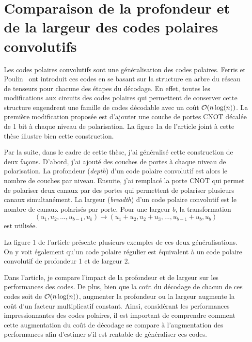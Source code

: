 \section{Comparaison de la profondeur et de la largeur des codes polaires convolutifs}

Les codes polaires convolutifs sont une généralisation des codes polaires.
Ferris et Poulin~\cite{ferris_branching_2014} ont introduit ces codes
en se basant sur la structure en arbre du réseau de tenseurs pour 
chacune des étapes du décodage.
En effet, 
toutes les modifications aux circuits des codes polaires qui permettent
de conserver cette structure engendrent une famille de codes décodable
avec un coût $\mathcal{O}(n \log(n))$.
La première modification proposée est d'ajouter 
une couche de portes CNOT décalée de 1 bit à chaque niveau de polarisation.
La figure 1a de l'article joint à cette thèse illustre bien cette construction.

Par la suite,
dans le cadre de cette thèse,
j'ai généralisé cette construction de deux façons.
D'abord,
j'ai ajouté des couches de portes à chaque niveau de polarisation.
La profondeur (\textit{depth}) d'un code polaire convolutif est
alors le nombre de couches par niveau.
Ensuite, j'ai remplacé la porte CNOT qui
permet de polariser deux canaux par des portes qui permettent de polariser plusieurs 
canaux simultanément.
La largeur (\textit{breadth}) d'un code polaire convolutif est le nombre de
canaux polarisés par porte.
Pour une largeur $b$, 
la transformation
\begin{equation}
  (u_1, u_2, \ldots, u_{b-1}, u_b) 
  \to 
  (u_1 + u_2, u_2 + u_3, \ldots, u_{b-1} + u_b, u_b) 
\end{equation}
est utilisée.

La figure 1 de l'article présente plusieurs exemples de ces deux généralisations.
On y voit également qu'un code polaire régulier est équivalent à un code polaire convolutif
de profondeur 1 et de largeur 2.

Dans l'article,
je compare l'impact de la profondeur et de largeur sur les performances des codes.
De plus, 
bien que la coût du décodage de chacun de ces codes soit de $\mathcal{O}(n \log(n))$,
augmenter la profondeur ou la largeur augmente la coût d'un facteur multiplicatif constant.
Ainsi,
considérant les performances impressionnantes des codes polaires,
il est important de comprendre comment cette augmentation du coût de décodage 
se compare à l'augmentation des performances
afin d'estimer s'il est rentable de généraliser ces codes.

